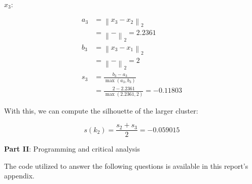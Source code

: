 \documentclass[12pt]{article}
\begin{document}
\begin{enumerate}[leftmargin=\labelsep]
\begin{enumerate}[leftmargin=\labelsep]
\begin{paracol}{2}
                  \switchcolumn

                  $x_3$:

                  \begin{equation*}
                    \begin{aligned}
                      a_3 & = \left\| x_3 - x_2 \right\|_2                                           \\
                          & = \left\|  -  \right\|_2
                      = 2.2361                                                                       \\
                      b_3 & = \left\| x_3 - x_1 \right\|_2                                           \\
                          & = \left\|  -  \right\|_2
                      = 2                                                                            \\
                      s_3 & = \frac{b_3 - a_3}{\max(a_3, b_3)}                                       \\
                          & = \frac{2 - 2.2361}{\max(2.2361, 2)} = -0.11803
                    \end{aligned}
                  \end{equation*}

                \end{paracol}

                \vspace*{0.5cm}

                With this, we can compute the silhouette of the larger cluster:

                \begin{equation*}
                  s(k_2) = \frac{s_2 + s_3}{2} = -0.059015
                \end{equation*}


        \end{enumerate}

\end{enumerate}

\pagebreak

\center\large{\textbf{Part II}: Programming and critical analysis}

\begin{justify}
  The code utilized to answer the following questions is available in this
  report's appendix.
\end{justify}
\end{document}
